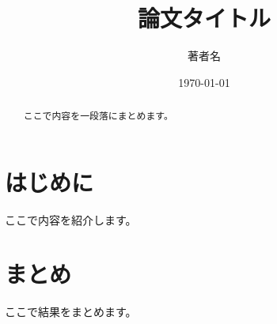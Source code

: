 \documentclass[12pt]{report}
\title{論文タイトル}
\author{著者名}
\date{\today}
\begin{document}
\maketitle

\begin{abstract}
ここで内容を一段落にまとめます。
\end{abstract}

\tableofcontents

\chapter{はじめに}
ここで内容を紹介します。

\chapter{まとめ}
ここで結果をまとめます。
\end{document}
